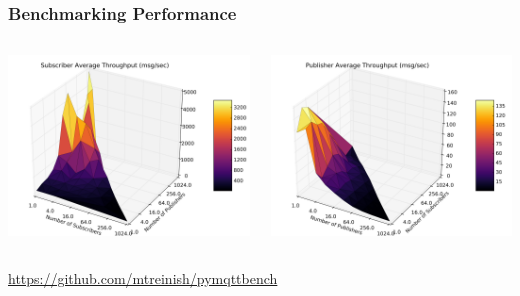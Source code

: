 \documentclass[aspectratio=169,11pt,hyperref={colorlinks=true}]{beamer}
\begin{document}
\begin{frame}
    \frametitle{Benchmarking Performance}
    \begin{columns}[T]
        \begin{column}{.48\textwidth}
            \includegraphics[width=\textwidth]{sub_throughput.png}
        \end{column}
        \begin{column}{.48\textwidth}
            \includegraphics[width=\textwidth]{pub_throughput.png}
        \end{column}
    \end{columns}
    \href{https://github.com/mtreinish/pymqttbench}{https://github.com/mtreinish/pymqttbench}
\end{frame}
\end{document}
